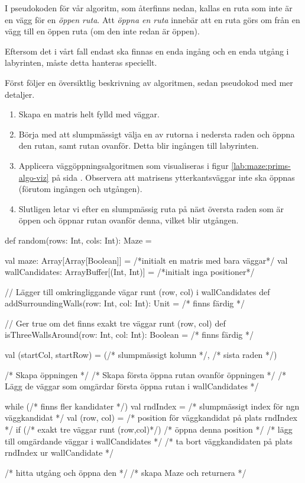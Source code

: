 I pseudokoden för vår algoritm, som återfinns nedan, kallas en ruta som inte är en vägg för en \emph{öppen ruta}. Att \emph{öppna en ruta} innebär att en ruta görs om från en vägg till en öppen ruta (om den inte redan är öppen). 
 
Eftersom det i vårt fall endast ska finnas en enda ingång och en enda utgång i labyrinten, måste detta hanteras speciellt.

Först följer en översiktlig beskrivning av algoritmen, sedan pseudokod med mer detaljer.

\begin{enumerate}[noitemsep]
    \item Skapa en matris helt fylld med väggar.
	\item Börja med att slumpmässigt välja en av rutorna i nedersta raden och öppna den rutan, samt rutan ovanför. Detta blir ingången till labyrinten.
	\item Applicera väggöppningsalgoritmen som visualiseras i figur \ref{lab:maze:prims-algo-viz} på sida \pageref{lab:maze:prims-algo-viz}. Observera att matrisens ytterkantsväggar inte ska öppnas (förutom ingången och utgången).
	\item Slutligen letar vi efter en slumpmässig ruta på näst översta raden som är öppen och öppnar rutan ovanför denna, vilket blir utgången.
\end{enumerate}

\begin{CodeSmall}
  def random(rows: Int, cols: Int): Maze = {
    val maze: Array[Array[Boolean]] = /*initialt en matris med bara väggar*/
    val wallCandidates: ArrayBuffer[(Int, Int)] = /*initialt inga positioner*/

    // Lägger till omkringliggande vägar runt (row, col) i wallCandidates
    def addSurroundingWalls(row: Int, col: Int): Unit = /* finns färdig */

    // Ger true om det finns exakt tre väggar runt (row, col)
    def isThreeWallsAround(row: Int, col: Int): Boolean = /* finns färdig */

    val (startCol, startRow) = (/* slumpmässigt kolumn */, /* sista raden */)

    /* Skapa öppningen */
    /* Skapa första öppna rutan ovanför öppningen */
    /* Lägg de väggar som omgärdar första öppna rutan i wallCandidates */ 

    while (/* finns fler kandidater */) {
      val rndIndex = /* slumpmässigt index för ngn väggkandidat */
      val (row, col) = /* position för väggkandidat på plats rndIndex */
      if (/* exakt tre väggar runt (row,col)*/) {
        /* öppna denna position */
        /* lägg till omgärdande väggar i wallCandidates */
      }
      /* ta bort väggkandidaten på plats rndIndex ur wallCandidate */
    }

    /* hitta utgång och öppna den */
    /* skapa Maze och returnera */
  }
\end{CodeSmall}


